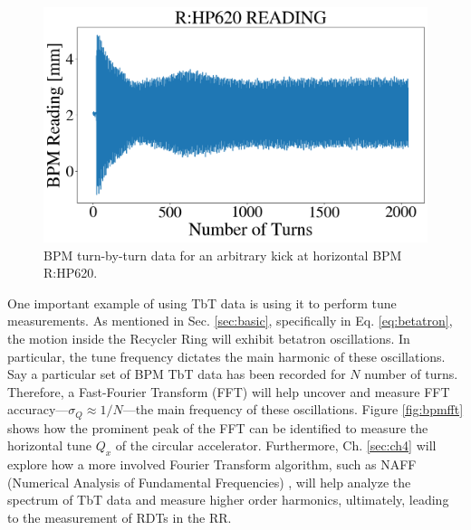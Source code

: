 \begin{figure}[H]
   \centering
   \includegraphics[width=\columnwidth]{chapter3/bpm_kick.png}
   \caption{BPM turn-by-turn data for an arbitrary kick at horizontal BPM R:HP620.}
   \label{fig:bpmkick}
   \vspace{-1.25em}
\end{figure}

One important example of using TbT data is using it to perform tune measurements. As mentioned in Sec. \ref{sec:basic}, specifically in Eq. \ref{eq:betatron}, the motion inside the Recycler Ring will exhibit betatron oscillations. In particular, the tune frequency dictates the main harmonic of these oscillations. Say a particular set of BPM TbT data has been recorded for $N$ number of turns. Therefore, a Fast-Fourier Transform (FFT) will help uncover and measure FFT accuracy---$\sigma_Q\approx 1/N $---the main frequency of these oscillations. Figure \ref{fig:bpmfft} shows how the prominent peak of the FFT can be identified to measure the horizontal tune $Q_x$ of the circular accelerator. Furthermore, Ch. \ref{sec:ch4} will explore how a more involved Fourier Transform algorithm, such as NAFF (Numerical Analysis of Fundamental Frequencies) \cite{naff}, will help analyze the spectrum of TbT data and measure higher order harmonics, ultimately, leading to the measurement of RDTs in the RR.     

